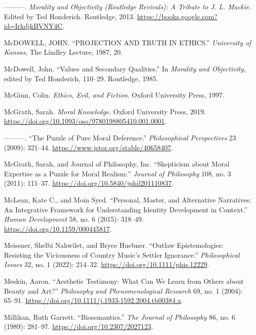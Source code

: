 \documentclass[phdthesis,12pt,final]{wuthesis}
\newlength{\cslhangindent}
\newenvironment{CSLReferences}[2] %
{\begin{list}{}{%
	\setlength{\itemindent}{0pt}
	\setlength{\leftmargin}{0pt}
	\setlength{\parsep}{0pt}
	\ifodd #1
	\setlength{\leftmargin}{\cslhangindent}
	\setlength{\itemindent}{-1\cslhangindent}
	\fi
	\setlength{\itemsep}{#2\baselineskip}}}
{\end{list}}
\theoremstyle{definition}
\theoremstyle{definition}
\theoremstyle{definition}
\theoremstyle{definition}
\theoremstyle{remark}
\begin{document}
\begin{CSLReferences}{1}{0}
---------. \emph{Morality and {Objectivity} ({Routledge Revivals}): {A Tribute} to {J}. {L}. {Mackie}}. Edited by Ted Honderich. Routledge, 2013. \url{https://books.google.com?id=IrkdjkBVNY4C}.

McDOWELL, JOHN. {``{PROJECTION AND TRUTH IN ETHICS}.''} \emph{University of Kansas}, The {Lindley Lecture}, 1987, 20.

McDowell, John. {``Values and {Secondary Qualities}.''} In \emph{Morality and {Objectivity}}, edited by Ted Honderich, 110--29. Routledge, 1985.

McGinn, Colin. \emph{Ethics, {Evil}, and {Fiction}}. Oxford University Press, 1997.

McGrath, Sarah. \emph{Moral {Knowledge}}. Oxford University Press, 2019. \url{https://doi.org/10.1093/oso/9780198805410.001.0001}.

---------. {``The {Puzzle} of {Pure Moral Deference}.''} \emph{Philosophical Perspectives} 23 (2009): 321--44. \url{https://www.jstor.org/stable/40658407}.

McGrath, Sarah, and Journal of Philosophy, Inc. {``Skepticism about {Moral Expertise} as a {Puzzle} for {Moral Realism}:''} \emph{Journal of Philosophy} 108, no. 3 (2011): 111--37. \url{https://doi.org/10.5840/jphil201110837}.

McLean, Kate C., and Moin Syed. {``Personal, {Master}, and {Alternative Narratives}: {An Integrative Framework} for {Understanding Identity Development} in {Context}.''} \emph{Human Development} 58, no. 6 (2015): 318--49. \url{https://doi.org/10.1159/000445817}.

Meissner, Shelbi Nahwilet, and Bryce Huebner. {``Outlaw Epistemologies: {Resisting} the Viciousness of Country Music's Settler Ignorance.''} \emph{Philosophical Issues} 32, no. 1 (2022): 214--32. \url{https://doi.org/10.1111/phis.12229}.

Meskin, Aaron. {``Aesthetic {Testimony}: {What Can We Learn} from {Others} about {Beauty} and {Art}?''} \emph{Philosophy and Phenomenological Research} 69, no. 1 (2004): 65--91. \url{https://doi.org/10.1111/j.1933-1592.2004.tb00384.x}.

Millikan, Ruth Garrett. {``Biosemantics.''} \emph{The Journal of Philosophy} 86, no. 6 (1989): 281--97. \url{https://doi.org/10.2307/2027123}.


\end{CSLReferences}
\end{document}
